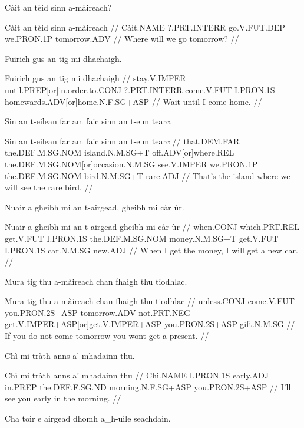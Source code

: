 \documentclass[a4paper,10pt]{article}
\begin{document}
\ex
\begingl
\glpre Càit an tèid sinn a-màireach? 

\vspace{4mm}
\gla Càit an tèid sinn a-màireach  //
\glb Càit.NAME ?.PRT.INTERR go.V.FUT.DEP we.PRON.1P tomorrow.ADV  //
\glft Where will we go tomorrow? //
\endgl
\xe

\ex
\begingl
\glpre Fuirich gus an tig mi dhachaigh. 

\vspace{4mm}
\gla Fuirich gus an tig mi dhachaigh  //
\glb stay.V.IMPER until.PREP[or]in.order.to.CONJ ?.PRT.INTERR come.V.FUT I.PRON.1S homewards.ADV[or]home.N.F.SG+ASP  //
\glft Wait until I come home. //
\endgl
\xe

\ex
\begingl
\glpre Sin an t-eilean far am faic sinn an t-eun tearc. 

\vspace{4mm}
\gla Sin an t-eilean far am faic sinn an t-eun tearc  //
\glb that.DEM.FAR the.DEF.M.SG.NOM island.N.M.SG+T off.ADV[or]where.REL the.DEF.M.SG.NOM[or]occasion.N.M.SG see.V.IMPER we.PRON.1P the.DEF.M.SG.NOM bird.N.M.SG+T rare.ADJ  //
\glft That's the island where we will see the rare bird. //
\endgl
\xe

\ex
\begingl
\glpre Nuair a gheibh mi an t-airgead, gheibh mi càr ùr. 

\vspace{4mm}
\gla Nuair a gheibh mi an t-airgead gheibh mi càr ùr  //
\glb when.CONJ which.PRT.REL get.V.FUT I.PRON.1S the.DEF.M.SG.NOM money.N.M.SG+T get.V.FUT I.PRON.1S car.N.M.SG new.ADJ  //
\glft When I get the money, I will get a new car. //
\endgl
\xe

\ex
\begingl
\glpre Mura tig thu a-màireach chan fhaigh thu tiodhlac. 

\vspace{4mm}
\gla Mura tig thu a-màireach chan fhaigh thu tiodhlac  //
\glb unless.CONJ come.V.FUT you.PRON.2S+ASP tomorrow.ADV not.PRT.NEG get.V.IMPER+ASP[or]get.V.IMPER+ASP you.PRON.2S+ASP gift.N.M.SG  //
\glft If you do not come tomorrow you wont get a present. //
\endgl
\xe

\ex
\begingl
\glpre Chì mi tràth anns a' mhadainn thu. 

\vspace{4mm}
\gla Chì mi tràth anns a' mhadainn thu  //
\glb Chì.NAME I.PRON.1S early.ADJ in.PREP the.DEF.F.SG.ND morning.N.F.SG+ASP you.PRON.2S+ASP  //
\glft I'll see you early in the morning. //
\endgl
\xe

\ex
\begingl
\glpre Cha toir e airgead dhomh a\_h-uile seachdain. 
\end{document}
